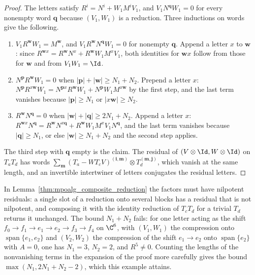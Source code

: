 \begin{proof}
    \leanok
    The letters satisfy $R^i=N^i+W_1M^iV_1$, and $V_1N^{\mathbf q}W_1=0$ for
    every nonempty word $\mathbf q$ because $(V_1,W_1)$ is a reduction. Three
    inductions on words give the following.
    \begin{enumerate}
        \item $V_1R^{\mathbf w}W_1=M^{\mathbf w}$, and
              $V_1R^{\mathbf w}N^{\mathbf q}W_1=0$ for nonempty $\mathbf q$.
              Append a letter $x$ to $\mathbf w$: since
              $R^{\mathbf wx}=R^{\mathbf w}N^x+R^{\mathbf w}W_1M^xV_1$, both
              identities for $\mathbf wx$ follow from those for $\mathbf w$
              and from $V_1W_1=\Id$.
        \item $N^{\mathbf p}R^{\mathbf w}W_1=0$ when
              $|\mathbf p|+|\mathbf w|\geq N_1+N_2$. Prepend a letter $x$:
              $N^{\mathbf p}R^{x\mathbf w}W_1=N^{\mathbf px}R^{\mathbf w}W_1
                  +N^{\mathbf p}W_1M^{x\mathbf w}$ by the first step, and the
              last term vanishes because $|\mathbf p|\geq N_1$ or
              $|x\mathbf w|\geq N_2$.
        \item $R^{\mathbf w}N^{\mathbf q}=0$ when
              $|\mathbf w|+|\mathbf q|\geq 2N_1+N_2$. Append a letter $x$:
              $R^{\mathbf wx}N^{\mathbf q}=R^{\mathbf w}N^{x\mathbf q}
                  +R^{\mathbf w}W_1M^xV_1N^{\mathbf q}$, and the last term
              vanishes because $|\mathbf q|\geq N_1$, or else
              $|\mathbf w|\geq N_1+N_2$ and the second step applies.
    \end{enumerate}
    The third step with $\mathbf q$ empty is the claim. The residual of
    $(V\otimes\Id,W\otimes\Id)$ on $T_aT_d$ has words
    $\sum_{\mathbf m}(T_a-WT_cV)^{(\mathbf i,\mathbf m)}\otimes
        T_d^{(\mathbf m,\mathbf j)}$, which vanish at the same length, and an
    invertible intertwiner of letters conjugates the residual letters.
\end{proof}

\begin{remark}%
    \label{rem:mpoalg_composite_reduction_sharp}
    In Lemma~\ref{thm:mpoalg_composite_reduction} the factors must have
    nilpotent residuals: a single slot of a reduction onto several blocks has a residual that is not nilpotent, and composing
    it with the identity reduction of $T_cT_d$ for a trivial $T_d$ returns it
    unchanged. The bound $N_1+N_2$ fails: for one letter acting as the shift
    $f_0\to f_1\to e_1\to e_2\to f_3\to f_4$ on $\C^6$, with $(V_1,W_1)$ the
    compression onto $\operatorname{span}\{e_1,e_2\}$ and $(V_2,W_2)$ the
    compression of the shift $e_1\to e_2$ onto $\operatorname{span}\{e_2\}$
    with $A=0$, one has $N_1=3$, $N_2=2$, and $R^5\neq0$.
    Counting the lengths of the nonvanishing terms in the expansion of the
    proof more carefully gives the bound $\max(N_1,2N_1+N_2-2)$, which this
    example attains.
\end{remark}

